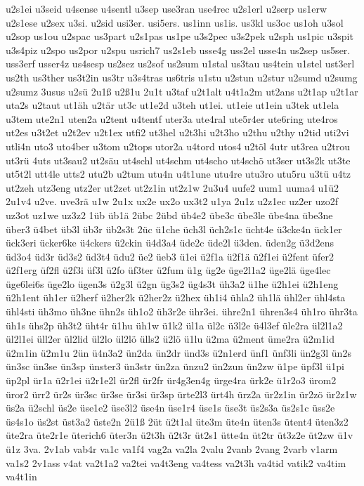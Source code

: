 {u2s1ei
u3seid
u4sense
u4sentl
u3sep
use3ran
use4rec
u2s1erl
u2serp
us1erw
u2s1ese
u2sex
u3si.
u2sid
usi3er.
usi5ers.
us1inn
us1is.
us3kl
us3oc
us1oh
u3sol
u2sop
us1ou
u2spac
us3part
u2s1pas
us1pe
u3s2pec
u3s2pek
u2sph
us1pic
u3spit
u3s4piz
u2spo
us2por
u2spu
usrich7
us2s1eb
usse4g
uss2el
usse4n
us2sep
us5ser.
uss3erf
usser4z
us4sesp
us2sez
us2sof
us2sum
u1stal
us3tau
us4tein
u1stel
ust3erl
us2th
us3ther
us3t2in
us3tr
u3s4tras
us6tris
u1stu
u2stun
u2stur
u2sumd
u2sumg
u2sumz
3usus
u2sü
2u1ß
u2ß1u
2u1t
u3taf
u2t1alt
u4t1a2m
ut2ans
u2t1ap
u2t1ar
uta2s
u2taut
ut1äh
u2tär
ut3c
ut1e2d
u3teh
ut1ei.
ut1eie
ut1ein
u3tek
ut1ela
u3tem
ute2n1
uten2a
u2tent
u4tentf
uter3a
ute4ral
ute5r4er
ute6ring
ute4ros
ut2es
u3t2et
u2t2ev
u2t1ex
utfi2
ut3hel
u2t3hi
u2t3ho
u2thu
u2thy
u2tid
uti2vi
utli4n
uto3
uto4ber
u3tom
u2tops
utor2a
u4tord
utos4
u2töl
4utr
ut3rea
u2trou
ut3rü
4uts
ut3sau2
ut2säu
ut4schl
ut4schm
ut4scho
ut4schö
ut3ser
ut3s2k
ut3te
ut5t2l
utt4le
utts2
utu2b
u2tum
utu4n
u4t1une
utu4re
utu3ro
utu5ru
u3tü
u4tz
ut2zeh
utz3eng
utz2er
ut2zet
ut2z1in
ut2z1w
2u3u4
uufe2
uum1
uuma4
u1ü2
2u1v4
u2ve.
uve3rä
u1w
2u1x
ux2e
ux2o
ux3t2
u1ya
2u1z
u2z1ec
uz2er
uzo2f
uz3ot
uz1we
uz3z2
1üb
üb1ä
2übc
2übd
üb4e2
übe3c
übe3le
übe4na
übe3ne
über3
ü4bet
üb3l
üb3r
üb2s3t
2üc
ü1che
üch3l
üch2s1c
ücht4e
ü3cke4n
ück1er
ück3eri
ücker6ke
ü4ckers
ü2ckin
ü4d3a4
üde2c
üde2l
ü3den.
üden2g
ü3d2ens
üd3o4
üd3r
üd3s2
üd3t4
üdu2
üe2
üeb3
ü1ei
ü2f1a
ü2f1ä
ü2f1ei
ü2fent
üfer2
ü2f1erg
üf2fl
ü2f3i
üf3l
ü2fo
üf3ter
ü2fum
ü1g
üg2e
üge2l1a2
üge2lä
üge4lec
üge6lei6s
üge2lo
ügen3s
ü2g3l
ü2gn
üg3s2
üg4s3t
üh3a2
ü1he
ü2h1ei
ü2h1eng
ü2h1ent
üh1er
ü2herf
ü2her2k
ü2her2z
ü2hex
üh1i4
ühla2
üh1lä
ühl2er
ühl4sta
ühl4sti
üh3mo
üh3ne
ühn2s
üh1o2
üh3r2e
ühr3ei.
ühre2n1
ühren3s4
üh1ro
ühr3ta
üh1s
ühs2p
üh3t2
üht4r
ü1hu
üh1w
ü1k2
ül1a
ül2c
ü3l2e
ü4l3ef
üle2ra
ül2l1a2
ül2l1ei
üll2er
ül2lid
ül2lo
ül2lö
ülls2
ü2lö
ü1lu
ü2ma
ü2ment
üme2ra
ü2m1id
ü2m1in
ü2m1u
2ün
ü4n3a2
ün2da
ün2dr
ünd3s
ü2n1erd
ünf1
ünf3li
ün2g3l
ün2s
ün3sc
ün3se
ün3sp
ünster3
ün3str
ün2za
ünzu2
ün2zun
ün2zw
ü1pe
üpf3l
ü1pi
üp2pl
ür1a
ü2r1ei
ü2r1e2l
ür2fl
ür2fr
ür4g3en4g
ürge4ra
ürk2e
ü1r2o3
ürom2
üror2
ürr2
ür2s
ür3sc
ür3se
ür3si
ür3sp
ürte2l3
ürt4h
ürz2a
ür2z1in
ür2zö
ür2z1w
üs2a
ü2schl
üs2e
üse1e2
üse3l2
üse4n
üse1r4
üse1s
üse3t
üs2s3a
üs2s1c
üss2e
üs4s1o
üs2st
üst3a2
üste2n
2ü1ß
2üt
ü2t1al
üte3m
üte4n
üten3s
ütent4
üten3z2
üte2ra
üte2r1e
üterich6
üter3n
ü2t3h
ü2t3r
üt2s1
ütte4n
üt2tr
üt3z2e
üt2zw
ü1v
ü1z
3va.
2v1ab
vab4r
va1c
va1f4
vag2a
va2la
2valu
2vanb
2vang
2varb
v1arm
va1s2
2v1ass
v4at
va2t1a2
va2tei
va4t3eng
va4tess
va2t3h
va4tid
vatik2
va4tim
va4t1in
}
